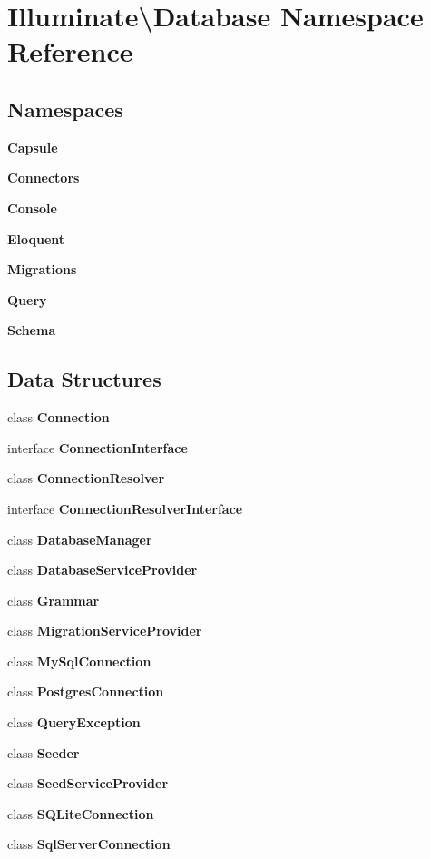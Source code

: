 \section{Illuminate\textbackslash{}Database Namespace Reference}
\label{namespace_illuminate_1_1_database}
\subsection*{Namespaces}
\begin{DoxyCompactItemize}
\item 
 {\bf Capsule}
\item 
 {\bf Connectors}
\item 
 {\bf Console}
\item 
 {\bf Eloquent}
\item 
 {\bf Migrations}
\item 
 {\bf Query}
\item 
 {\bf Schema}
\end{DoxyCompactItemize}
\subsection*{Data Structures}
\begin{DoxyCompactItemize}
\item 
class {\bf Connection}
\item 
interface {\bf Connection\+Interface}
\item 
class {\bf Connection\+Resolver}
\item 
interface {\bf Connection\+Resolver\+Interface}
\item 
class {\bf Database\+Manager}
\item 
class {\bf Database\+Service\+Provider}
\item 
class {\bf Grammar}
\item 
class {\bf Migration\+Service\+Provider}
\item 
class {\bf My\+Sql\+Connection}
\item 
class {\bf Postgres\+Connection}
\item 
class {\bf Query\+Exception}
\item 
class {\bf Seeder}
\item 
class {\bf Seed\+Service\+Provider}
\item 
class {\bf S\+Q\+Lite\+Connection}
\item 
class {\bf Sql\+Server\+Connection}
\end{DoxyCompactItemize}
